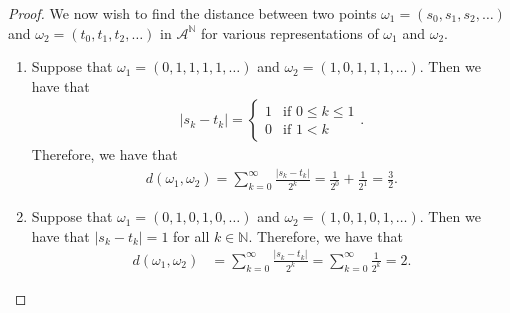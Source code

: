 \begin{proof}
  We now wish to find the distance between two points $\omega_1 = (s_0, s_1, s_2, \dots)$ and $\omega_2 = (t_0, t_1, t_2, \dots)$
  in $\mathcal{A}^\mathbb{N}$ for various representations of $\omega_1$ and $\omega_2$.
  \begin{enumerate}
    \item Suppose that $\omega_1 = (0, 1, 1, 1, 1, \dots)$ and $\omega_2 = (1, 0, 1, 1, 1, \dots )$. Then
      we have that
      \begin{align*}
        |s_k - t_k| =
        \begin{cases}
          1 & \text{if $0 \leq k \leq 1$} \\
          0 & \text{if $1 < k$}
        \end{cases}.
      \end{align*}
      Therefore, we have that
      \begin{align*}
        d(\omega_1, \omega_2) = \sum_{k=0}^\infty\frac{|s_k - t_k|}{2^k} = \frac{1}{2^0} + \frac{1}{2^1} = \frac{3}{2}.
      \end{align*}
    \item Suppose that $\omega_1 = (0, 1, 0, 1, 0, \dots)$ and $\omega_2 = (1, 0, 1, 0, 1, \dots )$. Then
      we have that $|s_k - t_k| = 1$ for all $k \in\mathbb{N}$.
      Therefore, we have that
      \begin{align*}
        d(\omega_1, \omega_2) &= \sum_{k=0}^\infty\frac{|s_k - t_k|}{2^k} = \sum_{k=0}^\infty\frac{1}{2^k} = 2.
      \end{align*}
  \end{enumerate}
\end{proof}
\newpage
